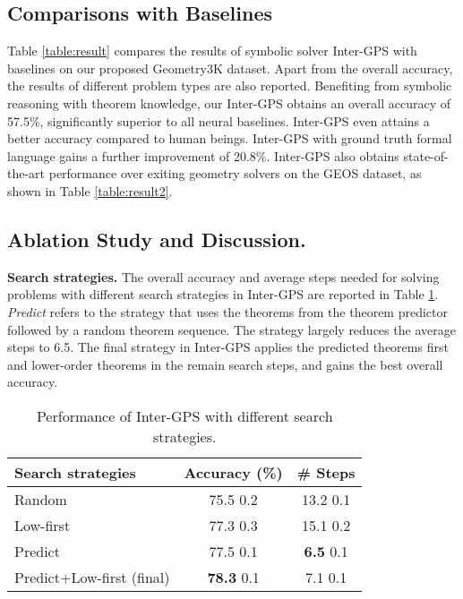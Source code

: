 \documentclass[11pt,a4paper]{article}
\begin{document}
\subsection{Comparisons with Baselines}

Table \ref{table:result} compares the results of symbolic solver Inter-GPS with baselines on our proposed Geometry3K dataset. Apart from the overall accuracy, the results of different problem types are also reported. Benefiting from symbolic reasoning with theorem knowledge, our Inter-GPS obtains an overall accuracy of 57.5\%, significantly superior to all neural baselines. Inter-GPS even attains a better accuracy compared to human beings. Inter-GPS with ground truth formal language gains a further improvement of 20.8\%. Inter-GPS also obtains state-of-the-art performance over exiting geometry solvers on the GEOS dataset, as shown in Table \ref{table:result2}.

\subsection{Ablation Study and Discussion.} \label{sec:discussion}

\noindent \textbf{Search strategies.} The overall accuracy and average steps needed for solving problems with different search strategies in Inter-GPS are reported in Table \ref{res_table:strategies}. \textit{Predict} refers to the strategy that uses the theorems from the theorem predictor followed by a random theorem sequence. The strategy largely reduces the average steps to 6.5. The final strategy in Inter-GPS applies the predicted theorems first and lower-order theorems in the remain search steps, and gains the best overall accuracy.

\begin{table}[ht]
\centering 
\setlength{\tabcolsep}{3pt}
\small 
\begin{tabular}{l|c|c}
	\hline
	 \textbf{Search strategies} & Accuracy (\%) & \# Steps  \\
	 \hline
	 Random & 75.5  0.2 & 13.2  0.1 \\
	 \hline
	 Low-first & 77.3  0.3 & 15.1  0.2 \\
	 \hline
	 Predict & 77.5  0.1 & \textbf{6.5}  0.1 \\
	 \hline
	 Predict+Low-first (final) & \textbf{78.3}  0.1 & 7.1  0.1 \\
	\hline
\end{tabular}
\caption{Performance of Inter-GPS with different search strategies.}
\label{res_table:strategies}
\end{table}
\end{document}
